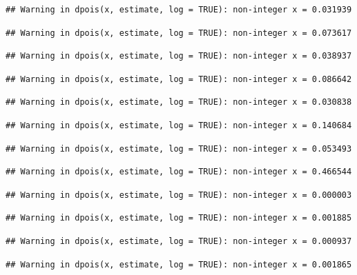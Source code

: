 \documentclass[]{article}
\begin{document}
\begin{verbatim}
## Warning in dpois(x, estimate, log = TRUE): non-integer x = 0.031939
\end{verbatim}

\begin{verbatim}
## Warning in dpois(x, estimate, log = TRUE): non-integer x = 0.073617
\end{verbatim}

\begin{verbatim}
## Warning in dpois(x, estimate, log = TRUE): non-integer x = 0.038937
\end{verbatim}

\begin{verbatim}
## Warning in dpois(x, estimate, log = TRUE): non-integer x = 0.086642
\end{verbatim}

\begin{verbatim}
## Warning in dpois(x, estimate, log = TRUE): non-integer x = 0.030838
\end{verbatim}

\begin{verbatim}
## Warning in dpois(x, estimate, log = TRUE): non-integer x = 0.140684
\end{verbatim}

\begin{verbatim}
## Warning in dpois(x, estimate, log = TRUE): non-integer x = 0.053493
\end{verbatim}

\begin{verbatim}
## Warning in dpois(x, estimate, log = TRUE): non-integer x = 0.466544
\end{verbatim}

\begin{verbatim}
## Warning in dpois(x, estimate, log = TRUE): non-integer x = 0.000003
\end{verbatim}

\begin{verbatim}
## Warning in dpois(x, estimate, log = TRUE): non-integer x = 0.001885
\end{verbatim}

\begin{verbatim}
## Warning in dpois(x, estimate, log = TRUE): non-integer x = 0.000937
\end{verbatim}

\begin{verbatim}
## Warning in dpois(x, estimate, log = TRUE): non-integer x = 0.001865
\end{verbatim}
\end{document}
